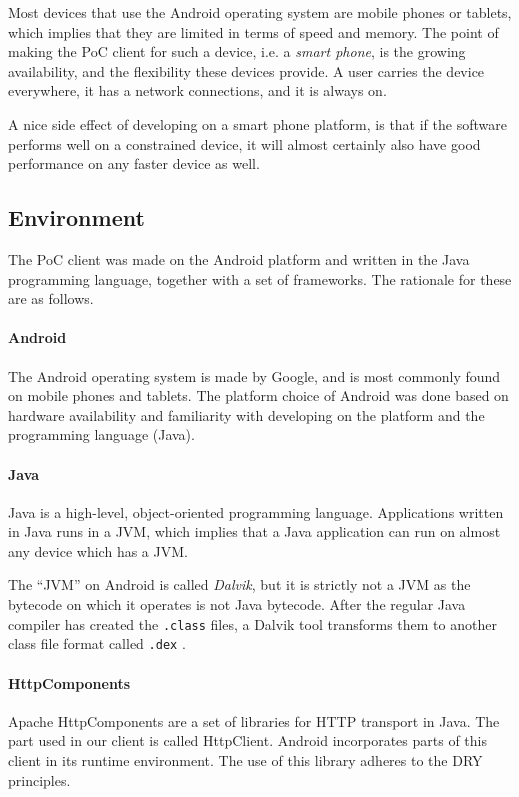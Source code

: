 \documentclass[pdftex,english,10pt,b5paper,twoside]{book}
\begin{document}
Most devices that use the Android operating system are mobile phones or
tablets, which implies that they are limited in terms of speed and
memory. The point of making the \ac{PoC} client for such a device, i.e. a
\emph{smart phone}, is the growing availability, and the flexibility these
devices provide. A user carries the device everywhere, it has a network
connections, and it is always on.

A nice side effect of developing on a smart phone platform, is that if the
software performs well on a constrained device, it will almost certainly also
have good performance on any faster device as well.

\subsection{Environment}

The \ac{PoC} client was made on the Android platform and written in the Java
programming language, together with a set of frameworks. The rationale for
these are as follows.

\paragraph{Android} The Android operating system is made by Google, and is most
commonly found on mobile phones and tablets. The platform choice of Android was
done based on hardware availability and familiarity with developing on the
platform and the programming language (Java).

\paragraph{Java} Java is a high-level, object-oriented programming language.
Applications written in Java runs in a \ac{JVM}, which implies that a Java
application can run on almost any device which has a \ac{JVM}.

The ``\ac{JVM}'' on Android is called \emph{Dalvik}, but it is strictly not a
\acl{JVM} as the bytecode on which it operates is not Java bytecode.
After the regular Java compiler has created the \texttt{.class} files, a Dalvik
tool transforms them to another class file format called \texttt{.dex}
\cite{dalvik}.

\paragraph{HttpComponents} Apache HttpComponents are a set of libraries for
\ac{HTTP} transport in Java. The part used in our client is called HttpClient.
Android incorporates parts of this client in its runtime environment. The use
of this library adheres to the \ac{DRY} principles.
\end{document}
